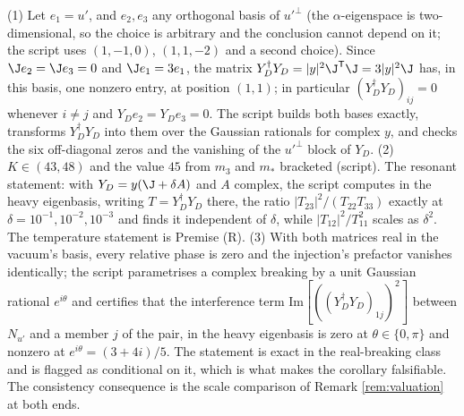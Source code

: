 (1) Let $e_{1} = u'$, and $e_{2}, e_{3}$ any orthogonal basis of $u'^{\perp}$ (the $\alpha$-eigenspace is two-dimensional, so the choice is arbitrary and the conclusion cannot depend on it; the script uses $(1, -1, 0)$, $(1, 1, -2)$ and a second choice). Since $\J e_{2} = \J e_{3} = 0$ and $\J e_{1} = 3e_{1}$, the matrix $Y_{D}^{\dagger}Y_{D} = |y|^{2}\J^{\mathsf{T}}\J = 3|y|^{2}\J$ has, in this basis, one nonzero entry, at position $(1,1)$; in particular $(Y_{D}^{\dagger}Y_{D})_{ij} = 0$ whenever $i \neq j$ and $Y_{D}e_{2} = Y_{D}e_{3} = 0$. The script builds both bases exactly, transforms $Y_{D}^{\dagger}Y_{D}$ into them over the Gaussian rationals for complex $y$, and checks the six off-diagonal zeros and the vanishing of the $u'^{\perp}$ block of $Y_{D}$. (2) $K \in (43, 48)$ and the value $45$ from $m_{3}$ and $m_{*}$ bracketed (script). The resonant statement: with $Y_{D} = y(\J + \delta A)$ and $A$ complex, the script computes in the heavy eigenbasis, writing $T = Y_{D}^{\dagger}Y_{D}$ there, the ratio $|T_{23}|^{2}/(T_{22}T_{33})$ exactly at $\delta = 10^{-1}, 10^{-2}, 10^{-3}$ and finds it independent of $\delta$, while $|T_{12}|^{2}/T_{11}^{2}$ scales as $\delta^{2}$. The temperature statement is Premise (R). (3) With both matrices real in the vacuum's basis, every relative phase is zero and the injection's prefactor vanishes identically; the script parametrises a complex breaking by a unit Gaussian rational $e^{i\theta}$ and certifies that the interference term $\mathrm{Im}[((Y_{D}^{\dagger}Y_{D})_{1j})^{2}]$ between $N_{u'}$ and a member $j$ of the pair, in the heavy eigenbasis is zero at $\theta \in \{0, \pi\}$ and nonzero at $e^{i\theta} = (3 + 4i)/5$. The statement is exact in the real-breaking class and is flagged as conditional on it, which is what makes the corollary falsifiable. The consistency consequence is the scale comparison of Remark \ref{rem:valuation} at both ends.
